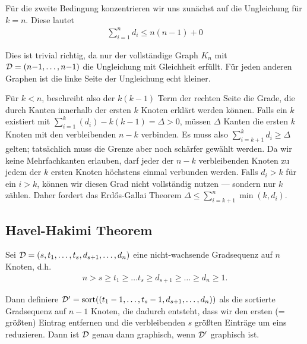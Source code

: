 Für die zweite Bedingung konzentrieren wir uns zunächst auf die Ungleichung für $k = n$.
Diese lautet
\begin{align}
    \sum_{i=1}^n d_i \le n(n-1) + 0
\end{align}

Dies ist trivial richtig, da nur der vollständige Graph $K_n$ mit $\mathcal{D} = (n{-}1, \ldots, n{-}1)$ die Ungleichung mit Gleichheit erfüllt.
Für jeden anderen Graphen ist die linke Seite der Ungleichung echt kleiner.

Für $k < n$, beschreibt also der $k(k-1)$ Term der rechten Seite die Grade, die durch Kanten innerhalb der ersten $k$ Knoten erklärt werden können.
Falls ein $k$ existiert mit $\sum_{i=1}^k (d_i) - k(k-1) = \Delta > 0$, müssen $\Delta$ Kanten die ersten $k$ Knoten mit den verbleibenden $n - k$ verbinden.
Es muss also $\sum_{i=k+1}^k d_i \ge \Delta$ gelten; tatsächlich muss die Grenze aber noch schärfer gewählt werden.
Da wir keine Mehrfachkanten erlauben, darf jeder der $n-k$ verbleibenden Knoten zu jedem der $k$ ersten Knoten höchstens einmal verbunden werden.
Falls $d_i > k$ für ein $i > k$, können wir diesen Grad nicht vollständig nutzen --- sondern nur $k$  zählen.
Daher fordert das Erd\H{o}s-Gallai Theorem $\Delta \le \sum_{i=k+1}^n \min(k, d_i)$.

\subsection{Havel-Hakimi Theorem}
\begin{theorem}
    Sei $\mathcal{D} = (s, t_1, \ldots, t_s, d_{s+1}, \ldots, d_n)$ eine nicht-wachsende Gradsequenz auf $n$ Knoten, d.h.
    \begin{align}
        n > s \ge t_1 \ge \ldots t_s \ge d_{s+1} \ge \ldots \ge d_n \ge 1.
    \end{align}

    \noindent
    Dann definiere $\mathcal{D}' = \text{sort}((t_1 - 1, \ldots, t_s - 1, d_{s+1}, \ldots, d_n))$ als die sortierte Gradsequenz auf $n-1$ Knoten,
    die dadurch entsteht, dass wir den ersten (= größten) Eintrag entfernen und die verbleibenden $s$ größten Einträge um eins reduzieren.
    Dann ist $\mathcal{D}$ genau dann graphisch, wenn $\mathcal{D}'$ graphisch ist.
\end{theorem}

